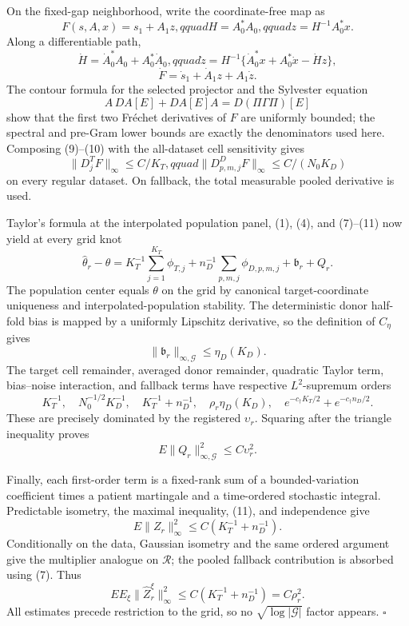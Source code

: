 On the fixed-gap neighborhood, write the coordinate-free map as
\[
 F(s,A,x)=s_1+A_1z,qquad
 H=A_0^*A_0,qquad z=H^{-1}A_0^*x.                        \tag{8}
\]
Along a differentiable path,
\[
 \dot H=\dot A_0^*A_0+A_0^*\dot A_0,qquad
 \dot z=H^{-1}\{\dot A_0^*x+A_0^*\dot x-\dot Hz\},
\]
\[
 \dot F=\dot s_1+\dot A_1z+A_1\dot z.                    \tag{9}
\]
The contour formula for the selected projector and the Sylvester equation
\[
 A\,DA[E]+DA[E]A=D(\Pi\Gamma\Pi)[E]                       \tag{10}
\]
show that the first two Fr\'echet derivatives of \(F\) are uniformly bounded; the spectral and pre-Gram lower bounds are exactly the denominators used here. Composing (9)--(10) with the all-dataset cell sensitivity gives
\[
 \|D_j^TF\|_\infty\le C/K_T,qquad
 \|D_{p,m,j}^DF\|_\infty\le C/(N_0K_D)                 \tag{11}
\]
on every regular dataset. On fallback, the total measurable pooled derivative is used.

Taylor's formula at the interpolated population panel, (1), (4), and (7)--(11) now yield at every grid knot
\[
 \widehat\theta_r-\theta
 =K_T^{-1}\sum_{j=1}^{K_T}\phi_{T,j}
 +n_D^{-1}\sum_{p,m,j}\phi_{D,p,m,j}
 +\mathfrak b_r+Q_r.                                      \tag{12}
\]
The population center equals \(\theta\) on the grid by canonical target-coordinate uniqueness and interpolated-population stability. The deterministic donor half-fold bias is mapped by a uniformly Lipschitz derivative, so the definition of \(C_\eta\) gives
\[
 \|\mathfrak b_r\|_{\infty,\mathcal G}\le\eta_D(K_D). \tag{13}
\]
The target cell remainder, averaged donor remainder, quadratic Taylor term, bias--noise interaction, and fallback terms have respective \(L^2\)-supremum orders
\[
 K_T^{-1},\quad N_0^{-1/2}K_D^{-1},\quad
 K_T^{-1}+n_D^{-1},\quad \rho_r\eta_D(K_D),\quad
 e^{-c_\dagger K_T/2}+e^{-c_\dagger n_D/2}.               \tag{14}
\]
These are precisely dominated by the registered \(\upsilon_r\). Squaring after the triangle inequality proves
\[
 E\|Q_r\|_{\infty,\mathcal G}^2\le C\upsilon_r^2.       \tag{15}
\]

Finally, each first-order term is a fixed-rank sum of a bounded-variation coefficient times a patient martingale and a time-ordered stochastic integral. Predictable isometry, the maximal inequality, (11), and independence give
\[
 E\|Z_r\|_\infty^2\le C(K_T^{-1}+n_D^{-1}).              \tag{16}
\]
Conditionally on the data, Gaussian isometry and the same ordered argument give the multiplier analogue on \(\mathcal R\); the pooled fallback contribution is absorbed using (7). Thus
\[
 E E_\xi\|\widehat Z_r^\xi\|_\infty^2
 \le C(K_T^{-1}+n_D^{-1})=C\rho_r^2.                     \tag{17}
\]
All estimates precede restriction to the grid, so no \(\sqrt{\log|\mathcal G|}\) factor appears. \(\square\)